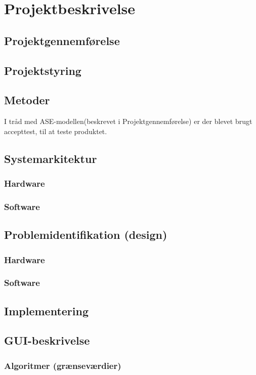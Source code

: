 \chapter{Projektbeskrivelse}
\section{Projektgennemførelse}
\section{Projektstyring}

\section{Metoder}
I tråd med ASE-modellen(beskrevet i Projektgennemførelse) er der blevet brugt accepttest, til at teste produktet.  
\section{Systemarkitektur}
\subsection{Hardware}
\subsection{Software}

\section{Problemidentifikation (design)}
\subsection{Hardware}
\subsection{Software}

\section{Implementering}
\section{GUI-beskrivelse}
\subsection{Algoritmer (grænseværdier)}
